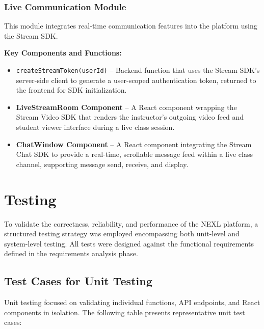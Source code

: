 \subsubsection{Live Communication Module}

This module integrates real-time communication features into the platform using the Stream SDK.

\textbf{Key Components and Functions:}
\begin{itemize}
    \item \texttt{createStreamToken(userId)} -- Backend function that uses the Stream SDK's server-side client to generate a user-scoped authentication token, returned to the frontend for SDK initialization.
    \item \textbf{LiveStreamRoom Component} -- A React component wrapping the Stream Video SDK that renders the instructor's outgoing video feed and student viewer interface during a live class session.
    \item \textbf{ChatWindow Component} -- A React component integrating the Stream Chat SDK to provide a real-time, scrollable message feed within a live class channel, supporting message send, receive, and display.
\end{itemize}

\section{Testing}

To validate the correctness, reliability, and performance of the NEXL platform, a structured testing strategy was employed encompassing both unit-level and system-level testing. All tests were designed against the functional requirements defined in the requirements analysis phase.

\subsection{Test Cases for Unit Testing}

Unit testing focused on validating individual functions, API endpoints, and React components in isolation. The following table presents representative unit test cases:

